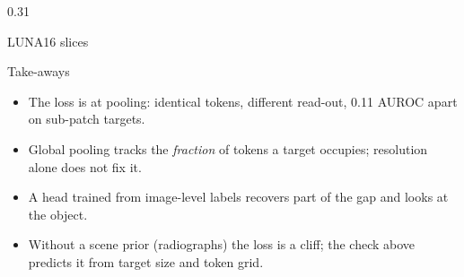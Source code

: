 \documentclass[final]{beamer}
\begin{document}
\begin{frame}[t]
\begin{columns}[t]
\begin{column}{0.31\textwidth}
\begin{block}{LUNA16 slices}
\end{block}
\begin{block}{Take-aways}
\begin{itemize}
\item The loss is at pooling: identical tokens, different read-out, 0.11 AUROC apart on sub-patch targets.
\item Global pooling tracks the \emph{fraction} of tokens a target occupies; resolution alone does not fix it.
\item A head trained from image-level labels recovers part of the gap and looks at the object.
\item Without a scene prior (radiographs) the loss is a cliff; the check above predicts it from target size and token grid.
\end{itemize}
\end{block}
\end{column}
\end{columns}
\end{frame}
\end{document}
